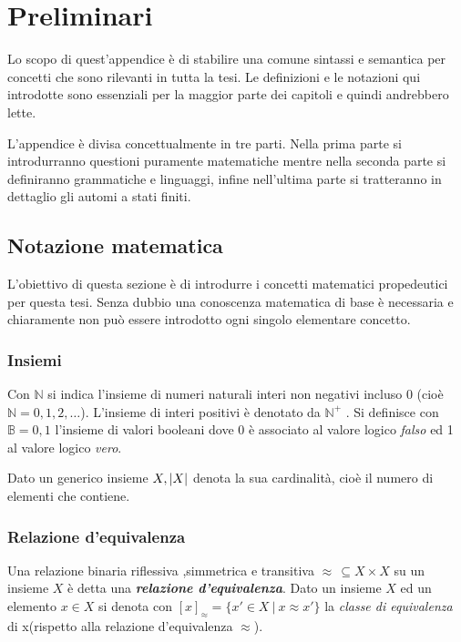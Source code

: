 
\chapter{Preliminari} %
\label{app:uno}
Lo scopo di quest'appendice è di stabilire una comune sintassi e semantica per concetti che sono rilevanti in tutta la tesi. Le definizioni e le notazioni qui introdotte sono essenziali per la maggior parte dei capitoli e quindi andrebbero lette.

L'appendice è divisa concettualmente in tre parti. Nella prima parte si introdurranno questioni  puramente matematiche mentre nella seconda parte si definiranno grammatiche e linguaggi, infine nell'ultima parte si tratteranno in dettaglio gli automi a stati finiti. 

\section{Notazione matematica}
L'obiettivo di questa sezione è di introdurre i concetti matematici propedeutici per questa tesi. Senza dubbio una conoscenza matematica di base è necessaria e chiaramente non può essere introdotto ogni singolo elementare concetto.
\subsection{Insiemi}
Con $\mathbb{N}$ si indica l'insieme di numeri naturali interi non negativi incluso 0 (cioè $\mathbb{N} = {0,1,2,\dots}$). L'insieme di interi positivi è denotato da $\mathbb{N}^{+}$ . Si definisce con $\mathbb{B} = {0,1}$ l'insieme di valori booleani dove 0 è associato al valore logico \textit{falso} ed 1 al valore logico \textit{vero}.

Dato un generico insieme $X, \lvert X\rvert$ denota la sua cardinalità, cioè il numero di elementi che contiene.
\subsection{Relazione d'equivalenza}
Una relazione binaria riflessiva ,simmetrica e transitiva  $\approx \, \subseteq X\!\times{}\!X$ su un insieme $X$ è detta una \textbf{\textit{relazione d'equivalenza}}. Dato un insieme $X$ ed un elemento $x \in X$ si denota con $[x]_\approx = \{x' \in X\ | \: x \approx x'\}$ la \textit{classe di equivalenza} di x(rispetto alla relazione d'equivalenza $\approx$).

